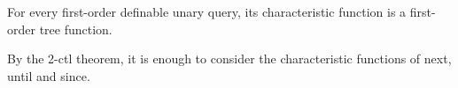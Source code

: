 \begin{lemma}\label{lem:fo-char} For every first-order definable unary query, its characteristic function is  a first-order tree function.
\end{lemma}
\begin{pr}
    By the 2-ctl theorem, it is enough to consider the characteristic functions of next, until and since.
    \end{pr}


         
